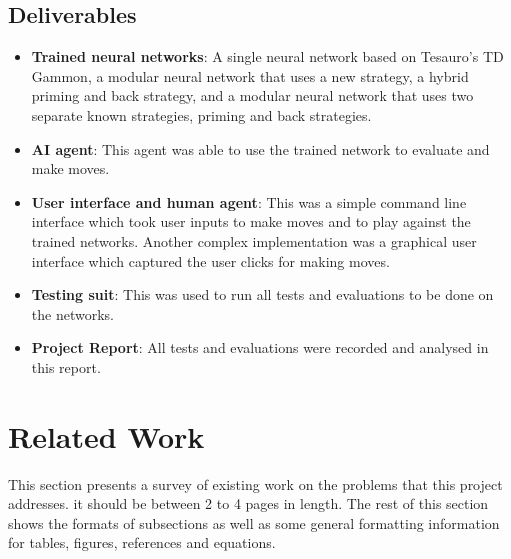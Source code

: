 \documentclass[12pt,a4paper]{article}
\begin{document}
\subsection{Deliverables}
\begin{itemize}
    \item \textbf{Trained neural networks}: A single neural network based on Tesauro's TD Gammon, a modular neural network that uses a new strategy, a hybrid priming and back strategy, and a modular neural network that uses two separate known strategies, priming and back strategies.
    \item \textbf{AI agent}: This agent was able to use the trained network to evaluate and make moves.
    \item \textbf{User interface and human agent}: This was a simple command line interface which took user inputs to make moves and to play against the trained networks. Another complex implementation was a graphical user interface which captured the user clicks for making moves.
    \item \textbf{Testing suit}: This was used to run all tests and evaluations to be done on the networks.
    \item \textbf{Project Report}: All tests and evaluations were recorded and analysed in this report.
\end{itemize}

\section{Related Work}
This section presents a survey of existing work on the problems that this project addresses.  it should be between 2 to 4 pages in length.  The rest of this section shows the formats of subsections as well as some general formatting information for tables, figures, references and equations.

\end{document}
